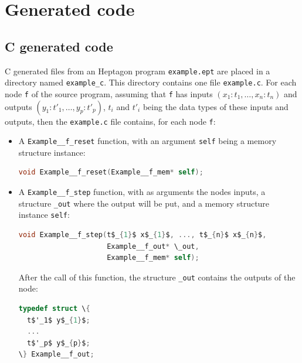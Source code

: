 \documentclass[a4paper]{article}
\begin{document}
\clearpage
\appendix

\section{Generated code}
\label{sec:app-generated-code}

\subsection{C generated code}
\label{sec:c-generated-code}

C generated files from an Heptagon program \texttt{example.ept} are placed in a
directory named \texttt{example\_c}. This directory contains one file
\texttt{example.c}. For each node \texttt{f} of the source program, assuming
that \texttt{f} has inputs $(x_1:t_1,\ldots,x_n:t_n)$ and outputs
$(y_1:t'_1,\ldots,y_p:t'_p)$, $t_i$ and $t'_i$ being the data types of these
inputs and outputs, then the \texttt{example.c} file contains, for each node
\texttt{f}:

\begin{itemize}
\item A \texttt{Example\_\_f\_reset} function, with an argument \texttt{self} being a
  memory structure instance:

\begin{lstlisting}[language=C]
void Example__f_reset(Example__f_mem* self);
\end{lstlisting}

\item A \texttt{Example\_\_f\_step} function, with as arguments the nodes inputs, a
  structure \texttt{\_out} where the output will be put, and a memory structure
  instance \texttt{self}:

\begin{lstlisting}[language=C]
void Example__f_step(t$_{1}$ x$_{1}$, ..., t$_{n}$ x$_{n}$,
                     Example__f_out* \_out,
                     Example__f_mem* self);
\end{lstlisting}

After the call of this function, the structure \texttt{\_out} contains the
outputs of the node:
\begin{lstlisting}[language=C]
typedef struct \{
  t$'_1$ y$_{1}$;
  ...
  t$'_p$ y$_{p}$;
\} Example__f_out;
\end{lstlisting}
\end{itemize}
\end{document}
